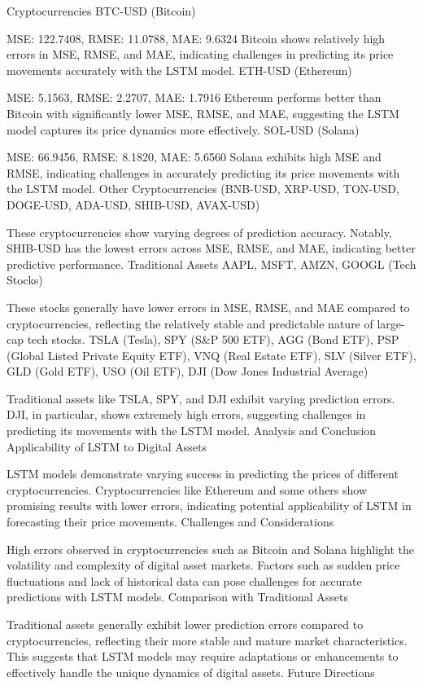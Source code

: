 Cryptocurrencies
BTC-USD (Bitcoin)

MSE: 122.7408, RMSE: 11.0788, MAE: 9.6324
Bitcoin shows relatively high errors in MSE, RMSE, and MAE, indicating challenges in predicting its price movements accurately with the LSTM model.
ETH-USD (Ethereum)

MSE: 5.1563, RMSE: 2.2707, MAE: 1.7916
Ethereum performs better than Bitcoin with significantly lower MSE, RMSE, and MAE, suggesting the LSTM model captures its price dynamics more effectively.
SOL-USD (Solana)

MSE: 66.9456, RMSE: 8.1820, MAE: 5.6560
Solana exhibits high MSE and RMSE, indicating challenges in accurately predicting its price movements with the LSTM model.
Other Cryptocurrencies (BNB-USD, XRP-USD, TON-USD, DOGE-USD, ADA-USD, SHIB-USD, AVAX-USD)

These cryptocurrencies show varying degrees of prediction accuracy. Notably, SHIB-USD has the lowest errors across MSE, RMSE, and MAE, indicating better predictive performance.
Traditional Assets
AAPL, MSFT, AMZN, GOOGL (Tech Stocks)

These stocks generally have lower errors in MSE, RMSE, and MAE compared to cryptocurrencies, reflecting the relatively stable and predictable nature of large-cap tech stocks.
TSLA (Tesla), SPY (S&P 500 ETF), AGG (Bond ETF), PSP (Global Listed Private Equity ETF), VNQ (Real Estate ETF), SLV (Silver ETF), GLD (Gold ETF), USO (Oil ETF), DJI (Dow Jones Industrial Average)

Traditional assets like TSLA, SPY, and DJI exhibit varying prediction errors. DJI, in particular, shows extremely high errors, suggesting challenges in predicting its movements with the LSTM model.
Analysis and Conclusion
Applicability of LSTM to Digital Assets

LSTM models demonstrate varying success in predicting the prices of different cryptocurrencies. Cryptocurrencies like Ethereum and some others show promising results with lower errors, indicating potential applicability of LSTM in forecasting their price movements.
Challenges and Considerations

High errors observed in cryptocurrencies such as Bitcoin and Solana highlight the volatility and complexity of digital asset markets. Factors such as sudden price fluctuations and lack of historical data can pose challenges for accurate predictions with LSTM models.
Comparison with Traditional Assets

Traditional assets generally exhibit lower prediction errors compared to cryptocurrencies, reflecting their more stable and mature market characteristics. This suggests that LSTM models may require adaptations or enhancements to effectively handle the unique dynamics of digital assets.
Future Directions

